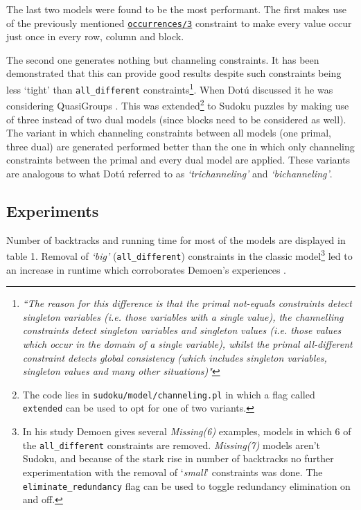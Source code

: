 The last two models were found to be the most performant. The first makes use of the previously mentioned \href{http://eclipseclp.org/doc/bips/lib/ic_global/occurrences-3.html}{\texttt{occurrences/3}} constraint to make every value occur just once in every row, column and block. 
\par The second one generates nothing but channeling constraints. It has been demonstrated that this can provide good results despite such constraints being less `tight' than \texttt{all\_different} constraints\footnote{\textit{``The reason for this difference is that the primal not-equals constraints detect singleton variables (i.e. those variables with a single value), the channelling constraints detect singleton variables and singleton values (i.e. those values which occur in the domain of a single variable), whilst the primal all-different constraint detects global consistency (which includes singleton variables, singleton values and many other situations)"}\cite{article:channeling}}. When Dot\'u discussed it he was considering QuasiGroups \cite{article:quasi}. This was extended\footnote{The code lies in \texttt{sudoku/model/channeling.pl} in which a flag called \texttt{extended} can be used to opt for one of two variants.} to Sudoku puzzles by making use of three instead of two dual models (since blocks need to be considered as well). The variant in which channeling constraints between all models (one primal, three dual) are generated performed better than the one in which only channeling constraints between the primal and every dual model are applied. These variants are analogous to what Dot\'u referred to as \textit{`trichanneling'} and \textit{`bichanneling'}.\\\par

\subsection{Experiments}

Number of backtracks and running time for most of the models are displayed in table 1. Removal of \textit{`big'} (\texttt{all\_different}) constraints in the classic model\footnote{In his study Demoen gives several \textit{Missing(6)} examples, models in which 6 of the \texttt{all\_different} constraints are removed. \textit{Missing(7)} models aren't Sudoku, and because of the stark rise in number of backtracks no further experimentation with the removal of `\textit{small}' constraints was done. The \texttt{eliminate\_redundancy} flag can be used to toggle redundancy elimination on and off.} led to an increase in runtime which corroborates Demoen's experiences \cite{article:demoen}. \\\par

